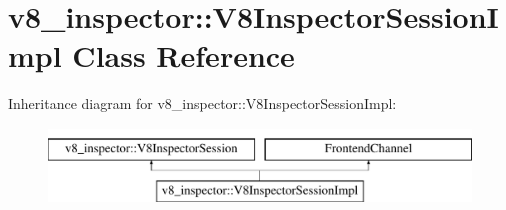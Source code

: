\hypertarget{classv8__inspector_1_1V8InspectorSessionImpl}{}\section{v8\+\_\+inspector\+:\+:V8\+Inspector\+Session\+Impl Class Reference}
\label{classv8__inspector_1_1V8InspectorSessionImpl}
Inheritance diagram for v8\+\_\+inspector\+:\+:V8\+Inspector\+Session\+Impl\+:\begin{figure}[H]
\begin{center}
\leavevmode
\includegraphics[height=2.000000cm]{classv8__inspector_1_1V8InspectorSessionImpl}
\end{center}
\end{figure}
